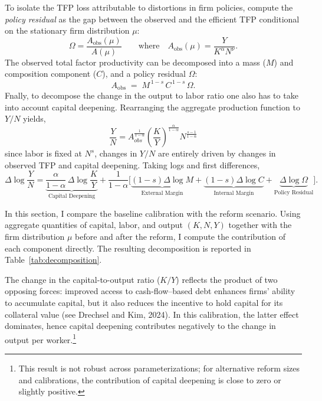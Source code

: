 \documentclass[12pt]{article}
\begin{document}
To isolate the TFP loss attributable to distortions in firm policies, compute the \emph{policy residual} as the gap between the observed and the efficient TFP conditional on the stationary firm distribution $\mu$:
$$ \Omega = \frac{A_{\text{obs}}(\mu)}{A(\mu)}
   \qquad \text{where} \quad A_{\text{obs}}(\mu)=\dfrac{Y}{K^{\alpha}N^{\nu}}. $$
The observed total factor productivity can be decomposed into a mass ($M$) and composition component ($C$), and a policy residual $\Omega$:    
$$A_{\text{obs}} \;=\; M^{\,1-s}\,C^{\,1-s}\,\Omega. $$
Fnally, to decompose the change in the output to labor ratio  one also has to take into account capital deepening. Rearranging the aggregate production function to $Y/N$ yields, 
$$ \frac{Y}{N} = A_{obs}^\frac{1}{1-\alpha} \left( \frac{K}{Y} \right)^\frac{\alpha}{1-\alpha} N^\frac{s - 1}{1-\alpha} $$
since labor is fixed at $N^s$, changes in $Y/N$ are entirely driven by changes in observed TFP and capital deepening. Taking logs and first differences,
$$ \Delta\log\frac{Y}{N}
= \underbrace{\frac{\alpha}{1-\alpha}\,\Delta\log\frac{K}{Y}}_{\text{Capital Deepening}}
+ \frac{1}{1-\alpha}\Big[ 
\underbrace{(1-s)\Delta\log M}_{\text{External Margin}} +  
\underbrace{(1-s)\Delta\log C}_{\text{Internal Margin}} + 
\underbrace{\Delta\log\Omega}_{\text{Policy Residual}}\Big]. $$

In this section, I compare the baseline calibration with the reform scenario. Using aggregate quantities of capital, labor, and output $(K,N,Y)$ together with the firm distribution $\mu$ before and after the reform, I compute the contribution of each component directly. The resulting decomposition is reported in Table~\ref{tab:decomposition}.

The change in the capital-to-output ratio ($K/Y$) reflects the product of two opposing forces: improved access to cash-flow–based debt enhances firms’ ability to accumulate capital, but it also reduces the incentive to hold capital for its collateral value (see Drechsel and Kim, 2024). In this calibration, the latter effect dominates, hence capital deepening contributes negatively to the change in output per worker.\footnote{This result is not robust across parameterizations; for alternative reform sizes and calibrations, the contribution of capital deepening is close to zero or slightly positive.}
\end{document}

